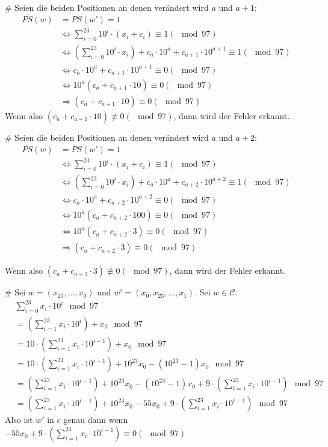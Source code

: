 \begin{myList}
#
Seien die beiden Positionen an denen verändert wird $a$ und $a+1$:
\begin{align*}
	PS(w) &= PS(w') = 1 \\
	 &\Leftrightarrow \sum_{i = 0}^{23} 10^i \cdot (x_i + c_i) \equiv 1 (\mod 97) \\
	  &\Leftrightarrow \left(\sum_{i = 0}^{23} 10^i \cdot x_i \right) + c_a \cdot 10^a + c_{a+1} \cdot 10^{a+1} \equiv 1 (\mod 97) \\
	  &\Leftrightarrow c_a \cdot 10^a + c_{a+1} \cdot 10^{a+1} \equiv 0 (\mod 97) \\
	  &\Leftrightarrow 10^a (c_a + c_{a+1} \cdot 10) \equiv 0 (\mod 97) \\
	  &\Rightarrow (c_a + c_{a+1} \cdot 10) \equiv 0 (\mod 97)
\end{align*}
Wenn also  $(c_a + c_{a+1} \cdot 10) \not\equiv 0 (\mod 97)$, dann wird der Fehler erkannt.

#
Seien die beiden Positionen an denen verändert wird $a$ und $a+2$:
\begin{align*}
	PS(w) &= PS(w') = 1 \\
	&\Leftrightarrow \sum_{i = 0}^{23} 10^i \cdot (x_i + c_i) \equiv 1 (\mod 97) \\
	&\Leftrightarrow \left(\sum_{i = 0}^{23} 10^i \cdot x_i \right) + c_a \cdot 10^a + c_{a+2} \cdot 10^{a+2} \equiv 1 (\mod 97) \\
	  &\Leftrightarrow c_a \cdot 10^a + c_{a+2} \cdot 10^{a+2} \equiv 0 (\mod 97) \\
	  &\Leftrightarrow 10^a (c_a + c_{a+2} \cdot 100) \equiv 0 (\mod 97) \\
	  &\Leftrightarrow 10^a (c_a + c_{a+2} \cdot 3) \equiv 0 (\mod 97) \\
	  &\Rightarrow (c_a + c_{a+2} \cdot 3) \equiv 0 (\mod 97)
\end{align*}

Wenn also $(c_a + c_{a+2} \cdot 3) \not\equiv 0 (\mod 97)$, dann wird der Fehler erkannt.

#
Sei $w = (x_{23}, \ldots , x_0)$ und $w' = (x_0, x_{23}, \ldots, x_1)$.
Sei $w \in \mathcal{C}$.
\begin{align*}
	&\sum_{i=0}^{23} x_i \cdot 10^i \mod 97 \\
	&= \left(\sum_{i=1}^{23} x_i \cdot 10^i\right) + x_0  \mod 97\\
	&= 10 \cdot \left(\sum_{i=1}^{23} x_i \cdot 10^{i-1}\right) + x_0 \mod 97 \\
	&= 10 \cdot \left(\sum_{i=1}^{23} x_i \cdot 10^{i-1}\right) + 10^{23}x_0 - (10^{23} -1) x_0 \mod 97 \\
	&= \left(\sum_{i=1}^{23} x_i \cdot 10^{i-1}\right) + 10^{23}x_0 - (10^{23} -1) x_0 + 9 \cdot \left(\sum_{i=1}^{23} x_i \cdot 10^{i-1}\right) \mod 97 \\
	&= \left(\sum_{i=1}^{23} x_i \cdot 10^{i-1}\right) + 10^{23}x_0 - 55 x_0 + 9 \cdot \left(\sum_{i=1}^{23} x_i \cdot 10^{i-1}\right) \mod 97
\end{align*}
Also ist $w'$ in $c$ genau dann wenn $- 55 x_0 + 9 \cdot \left(\sum_{i=1}^{23} x_i \cdot 10^{i-1}\right) \equiv 0 (\mod 97)$
\end{myList}
